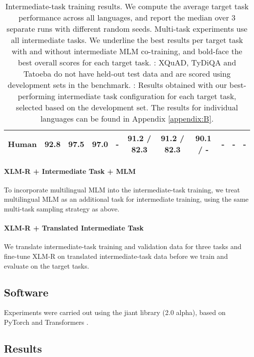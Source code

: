 \documentclass[11pt,a4paper]{article}
\begin{document}
\begin{table*}[t!]
{\begin{tabular}{ll ccccccccc c}
\multicolumn{2}{l}{{\bf Human \citep{hu2020xtreme}}} & 92.8 &  97.5 &  97.0 &  - &  91.2 / 82.3 &  91.2 / 82.3 &  90.1 / - &  - &  -  & - \\
\bottomrule
\end{tabular}
}
\caption{Intermediate-task training results. We compute the average target task performance across all languages, and report the median over 3 separate runs with different random seeds. Multi-task experiments use all intermediate tasks. We underline the best results per target task with and without intermediate MLM co-training, and bold-face the best overall scores for each target task. : XQuAD, TyDiQA and Tatoeba do not have held-out test data and are scored using development sets in the benchmark. : Results obtained with our best-performing intermediate task configuration for each target task, selected based on the development set. The results for individual languages can be found in Appendix \ref{appendix:B}.
}
\label{tab:single_and_multi_task_results}
\end{table*}


\paragraph{XLM-R + Intermediate Task + MLM} To incorporate multilingual MLM into the intermediate-task training, we treat multilingual MLM as an additional task for intermediate training, using the same multi-task sampling strategy as above.

\paragraph{XLM-R + Translated Intermediate Task} We translate intermediate-task training and validation data for three tasks
and fine-tune XLM-R on translated intermediate-task data before we train and evaluate on the target tasks. 


\subsection{Software}
Experiments were carried out using the jiant \citep{phang2020jiant} library (2.0 alpha), based on PyTorch \citep{paszke2019pytorch} and Transformers \citep{wolf2019transformers}.


\subsection{Results}\label{sec:results}
\end{document}
